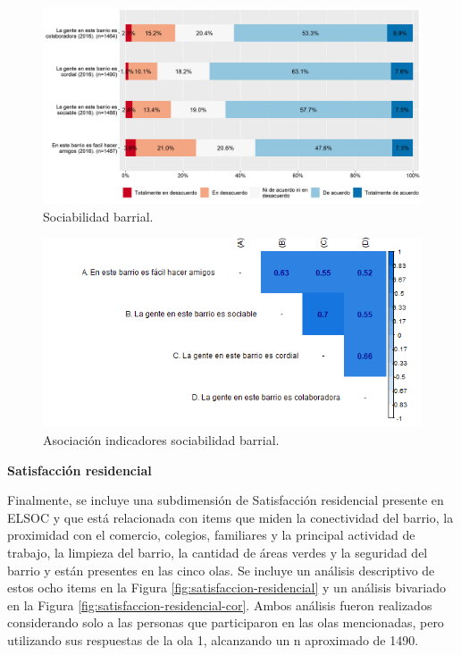 \documentclass[
  12pt,
]{book}
\begin{document}
\begin{figure}[H]

{\centering \includegraphics[width=1\linewidth,height=1\textheight]{output/graphs/sociabilidad-barrial} 

}

\caption{Sociabilidad barrial.}\label{fig:sociabilidad-barrial}
\end{figure}

\begin{figure}[H]

{\centering \includegraphics[width=1\linewidth,height=1\textheight]{output/graphs/sociabilidad-barrial_cor} 

}

\caption{Asociación indicadores sociabilidad barrial.}\label{fig:sociabilidad-barrial-cor}
\end{figure}

\textbf{Satisfacción residencial}

Finalmente, se incluye una subdimensión de Satisfacción residencial presente en ELSOC y que está relacionada con items que miden la conectividad del barrio, la proximidad con el comercio, colegios, familiares y la principal actividad de trabajo, la limpieza del barrio, la cantidad de áreas verdes y la seguridad del barrio y están presentes en las cinco olas. Se incluye un análisis descriptivo de estos ocho items en la Figura \ref{fig:satisfaccion-residencial} y un análisis bivariado en la Figura \ref{fig:satisfaccion-residencial-cor}. Ambos análisis fueron realizados considerando solo a las personas que participaron en las olas mencionadas, pero utilizando sus respuestas de la ola 1, alcanzando un n aproximado de 1490.
\end{document}
